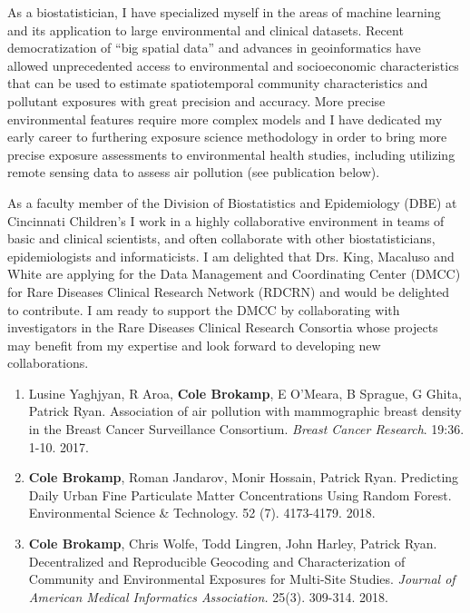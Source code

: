 \documentclass{nihbiosketch}
\begin{document}
\begin{statement}

As a biostatistician, I have specialized myself in the areas of machine learning and its application to large environmental and clinical datasets.  Recent democratization of “big spatial data” and advances in geoinformatics have allowed unprecedented access to environmental and socioeconomic characteristics that can be used to estimate spatiotemporal community characteristics and pollutant exposures with great precision and accuracy. More precise environmental features require more complex models and I have dedicated my early career to furthering exposure science methodology in order to bring more precise exposure assessments to environmental health studies, including utilizing remote sensing data to assess air pollution (see publication below).

As a faculty member of the Division of Biostatistics and Epidemiology (DBE) at Cincinnati Children’s I work in a highly collaborative environment in teams of basic and clinical scientists, and often collaborate with other biostatisticians, epidemiologists and informaticists. I am delighted that Drs. King, Macaluso and White are applying for the Data Management and Coordinating Center (DMCC) for Rare Diseases Clinical Research Network (RDCRN) and would be delighted to contribute.  I am ready to support the DMCC by collaborating with investigators in the Rare Diseases Clinical Research Consortia whose projects may benefit from my expertise and look forward to developing new collaborations.\\

\begin{enumerate}

	\item Lusine Yaghjyan, R Aroa, \textbf{Cole Brokamp}, E O'Meara, B Sprague, G Ghita, Patrick Ryan. Association of air pollution with mammographic breast density in the Breast Cancer Surveillance Consortium. \emph{Breast Cancer Research}. 19:36. 1-10. 2017.

	\item \textbf{Cole Brokamp}, Roman Jandarov, Monir Hossain, Patrick Ryan. Predicting Daily Urban Fine Particulate Matter Concentrations Using Random Forest. Environmental Science \& Technology. 52 (7). 4173-4179. 2018.

	\item \textbf{Cole Brokamp}, Chris Wolfe, Todd Lingren, John Harley, Patrick Ryan. Decentralized and Reproducible Geocoding and Characterization of Community and Environmental Exposures for Multi-Site Studies. \textit{Journal of American Medical Informatics Association.} 25(3). 309-314. 2018.

\end{enumerate}

\end{statement}
\end{document}
